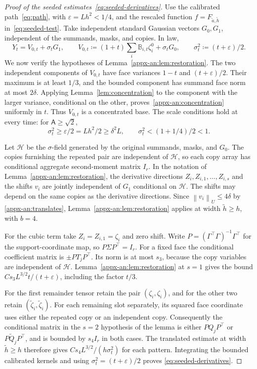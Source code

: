 \documentclass[11pt,letterpaper]{article}
\theoremstyle{remark}
\newcommand{\norm}[1]{\left\lVert#1\right\rVert}
\begin{document}
\begin{proof}[Proof of the seeded estimates~\eqref{eq:seeded-derivatives}]
Use the calibrated path~\eqref{eq:path}, with
\(\varepsilon=Lh^2<1/4\), and the rescaled function
\(f=F_{\widetilde a,\widetilde h}\) in~\eqref{eq:seeded-test}.
Take independent standard Gaussian vectors \(G_0,G_1\), independent
of the summands, masks, and copies. In law,
\begin{equation}
 Y_t=V_{0,t}+\sigma_tG_1,\qquad
 V_{0,t}\coloneqq(1+t)\sum_i\mathbb B_{i,t}\zeta_i^0+\sigma_tG_0,
 \qquad\sigma_t^2\coloneqq(t+\varepsilon)/2.
 \label{eq:seeded-gaussian-split}
\end{equation}
{We now verify the hypotheses of Lemma~\ref{appx-an:lem:restoration}.}
The two independent components of \(V_{0,t}\) have face variances
\(1-t\) and \((t+\varepsilon)/2\). Their maximum is at least
\(1/3\), and the bounded component has summand face norm at most
\(2\delta\). Applying Lemma~\ref{lem:concentration} to the
component with the larger variance, conditional on the other,
proves~\eqref{appx-an:concentration} uniformly in \(t\).
Thus \(V_{0,t}\) is a concentrated base. The scale conditions hold
at every time: for \(\mathsf A\ge\sqrt2\),
\[
 \sigma_t^2\ge\varepsilon/2=Lh^2/2\ge\delta^2L,
 \qquad \sigma_t^2<(1+1/4)/2<1.
\]

Let \(\mathcal H\) be the {\(\sigma\)-field} generated by the original
summands, masks, and \(G_0\). The copies furnishing the repeated
pair are independent of \(\mathcal H\), so each copy array has
conditional aggregate second-moment matrix \(I_r\). {In the notation
of Lemma~\ref{appx-an:lem:restoration}, the derivative directions
\(Z_i,Z_{i,1},\ldots,Z_{i,s}\) and the shifts \(v_i\) are jointly
independent of \(G_1\) conditional on \(\mathcal H\).
The shifts may depend on the same copies as the derivative directions.
Since \(\norm{v_i}_U\le4\delta\) by \eqref{appx-an:translates},
Lemma~\ref{appx-an:lem:restoration} applies at width
\(\widetilde h\ge h\), with \(b=4\).}

For the cubic term take $Z_i=Z_{i,1}=\zeta_i$ and zero shift. Write $P=(\Gamma^\top\Gamma)^{-1}\Gamma^\top$ for the support-coordinate map, so $P\Sigma P^\top=I_r$. For a fixed face the conditional coefficient matrix is $\pm P T_j P^\top$. Its norm is at most $s_3$, because the copy variables are independent of $\mathcal H$. Lemma~\ref{appx-an:lem:restoration} at $s=1$ gives the bound $C s_3 L^{3/2}t/(t+\varepsilon)$, including the factor $t/3$.

For the first remainder tensor retain the pair $(\zeta_i,\zeta_i)$, and for the other two retain $(\widetilde\zeta_i,\widetilde\zeta_i)$. For each remaining slot separately, its squared face coordinate uses either the repeated copy or an independent copy. Consequently the conditional matrix in the $s=2$ hypothesis of the lemma is either $P Q_jP^\top$ or $P\widetilde Q_jP^\top$, and is bounded by $s_4 I_r$ in both cases. The translated estimate at width $\widetilde h\ge h$ therefore gives $Cs_4L^{3/2}/(h\sigma_t^2)$ for each pattern. Integrating the bounded calibrated kernels and using $\sigma_t^2=(t+\varepsilon)/2$ proves \eqref{eq:seeded-derivatives}.

\end{proof}
\end{document}
